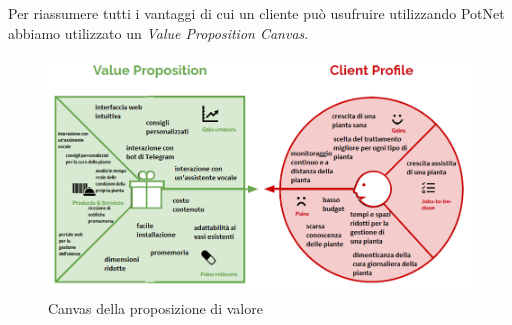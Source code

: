 Per riassumere tutti i vantaggi di cui un cliente può usufruire utilizzando PotNet abbiamo utilizzato un \textit{Value Proposition Canvas}.

\begin{figure}[h]
	\centering
	\includegraphics[width=\textwidth]{images/value_proposition.png}
	\caption{Canvas della proposizione di valore}
	\label{fig:value_proposition}
\end{figure}